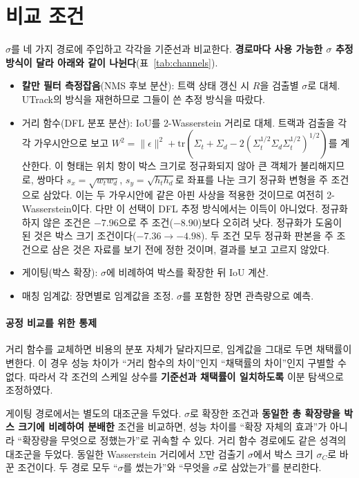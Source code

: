 \documentclass[12pt,a4paper,oneside]{report}
\begin{document}
\section{비교 조건}\label{sec:4-2}

$\sigma$를 네 가지 경로에 주입하고 각각을 기준선과 비교한다. \textbf{경로마다 사용 가능한 $\sigma$ 추정 방식이 달라 아래와 같이 나뉜다}(표~\ref{tab:channels}).

\begin{itemize}[leftmargin=2em]
\item \textbf{칼만 필터 측정잡음}(NMS 후보 분산): 트랙 상태 갱신 시 $R$을 검출별 $\sigma$로 대체. UTrack의 방식을 재현하므로 그들이 쓴 추정 방식을 따랐다.
\item 거리 함수(DFL 분포 분산): IoU를 2-Wasserstein 거리로 대체. 트랙과 검출을 각각 가우시안으로 보고 $W^2 = \|\epsilon\|^2 + \mathrm{tr}(\Sigma_t + \Sigma_d - 2(\Sigma_t^{1/2}\Sigma_d\Sigma_t^{1/2})^{1/2})$를 계산한다. 이 형태는 위치 항이 박스 크기로 정규화되지 않아 큰 객체가 불리해지므로, 쌍마다 $s_x = \sqrt{w_t w_d}$, $s_y = \sqrt{h_t h_d}$로 좌표를 나눈 크기 정규화 변형을 주 조건으로 삼았다. 이는 두 가우시안에 같은 아핀 사상을 적용한 것이므로 여전히 2-Wasserstein이다. 다만 이 선택이 DFL 추정 방식에서는 이득이 아니었다. 정규화하지 않은 조건은 $-7.96$으로 주 조건($-8.90$)보다 오히려 낫다. 정규화가 도움이 된 것은 박스 크기 조건이다($-7.36 \to -4.98$). 두 조건 모두 정규화 판본을 주 조건으로 삼은 것은 자료를 보기 전에 정한 것이며, 결과를 보고 고르지 않았다.
\item 게이팅(박스 확장): $\sigma$에 비례하여 박스를 확장한 뒤 IoU 계산.
\item 매칭 임계값: 장면별로 임계값을 조정. $\sigma$를 포함한 장면 관측량으로 예측.
\end{itemize}

\paragraph{공정 비교를 위한 통제} 거리 함수를 교체하면 비용의 분포 자체가 달라지므로, 임계값을 그대로 두면 채택률이 변한다. 이 경우 성능 차이가 ``거리 함수의 차이''인지 ``채택률의 차이''인지 구별할 수 없다. 따라서 각 조건의 스케일 상수를 \textbf{기준선과 채택률이 일치하도록} 이분 탐색으로 조정하였다.

게이팅 경로에서는 별도의 대조군을 두었다. $\sigma$로 확장한 조건과 \textbf{동일한 총 확장량을 박스 크기에 비례하여 분배한} 조건을 비교하면, 성능 차이를 ``확장 자체의 효과''가 아니라 ``확장량을 무엇으로 정했는가''로 귀속할 수 있다. 거리 함수 경로에도 같은 성격의 대조군을 두었다. 동일한 Wasserstein 거리에서 $\Sigma$만 검출기 $\sigma$에서 박스 크기 $\sigma_C$로 바꾼 조건이다. 두 경로 모두 ``$\sigma$를 썼는가''와 ``무엇을 $\sigma$로 삼았는가''를 분리한다.
\end{document}
